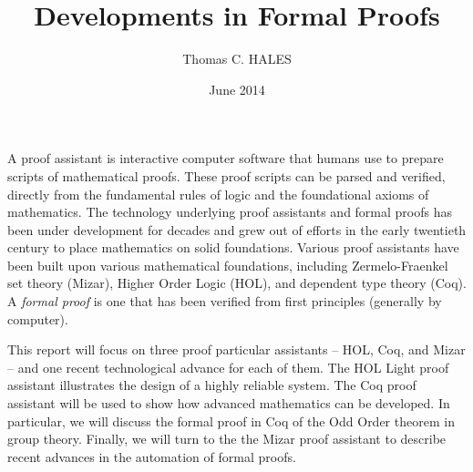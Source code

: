 \documentclass[brochure,english,12pt]{bourbaki}
\date{June 2014}
\title{Developments in Formal Proofs}
\author{Thomas C. HALES}
\theoremstyle{plain}
\begin{document}
\maketitle



{





}

\bigskip



A proof assistant is interactive computer software that humans use to prepare scripts of mathematical proofs.
These proof scripts can be parsed and verified, directly from
the fundamental rules of logic and the foundational axioms of mathematics.  
The
technology underlying proof assistants and formal proofs has been under development for decades and grew out
of efforts in the early twentieth century to place mathematics on solid foundations.
Various proof assistants have been built upon various mathematical foundations, including
Zermelo-Fraenkel set theory (Mizar), Higher Order Logic (HOL), and dependent type theory (Coq).
A {\it formal proof} is one that has been verified from first principles (generally by computer).  


This report
will focus on three proof particular assistants -- HOL, Coq, and Mizar -- and one recent technological advance for each of them.
The HOL Light proof assistant illustrates the design of a highly reliable system.
The Coq proof assistant will be used to show how advanced mathematics can be developed.  In particular, we will
discuss the formal proof in Coq of the Odd Order theorem in group theory.
Finally, we will turn to the the Mizar proof assistant to describe recent advances in the automation of formal proofs.

\end{document}
